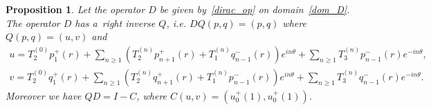 \documentclass[pdftex]{sigma}
\numberwithin{equation}{section}
\newtheorem{prop}[theo]{Proposition}
{\theoremstyle{definition}
\newtheorem{rem}[theo]{Remark}
\newtheorem{defin}[theo]{Definition}
}
\begin{document}
\begin{prop}
\label{cont_para}
Let the operator $D$ be given by~\eqref{dirac_op} on domain~\eqref{dom_D}.
The operator $D$ has a~right inverse $Q$, i.e.
$DQ(p,q)=(p,q)$ where $Q(p,q)=({u},{v})$ and
\begin{gather*}
{u} = T_2^{(0)}p_1^+(r) + \sum\limits_{n\ge 1}\left(T_2^{(n)}p_{n+1}^+(r) + T_1^{(n)}q_{n-1}^-(r)\right)e^{in\theta} +
\sum\limits_{n\ge1} T_3^{(n)}p_{n-1}^-(r)e^{-in\theta},
\\
{v} = T_2^{(0)}q_1^+(r) + \sum\limits_{n\ge 1}\left(T_2^{(n)}q_{n+1}^+(r) + T_1^{(n)}p_{n-1}^-(r)\right)e^{in\theta} +
\sum\limits_{n\ge1} T_3^{(n)}q_{n-1}^-(r)e^{-in\theta}.
\end{gather*}
Moreover we have $QD= I - C$, where $C(u,v) = \left(u_0^+(1), u_0^+(1)\right)$.
\end{prop}
\end{document}
